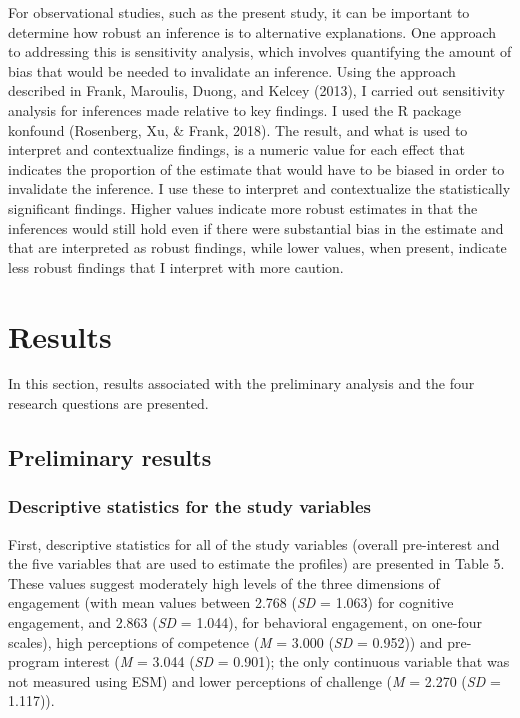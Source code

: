 \documentclass[]{book}
\theoremstyle{definition}
\theoremstyle{definition}
\theoremstyle{definition}
\theoremstyle{remark}
\begin{document}
For observational studies, such as the present study, it can be
important to determine how robust an inference is to alternative
explanations. One approach to addressing this is sensitivity analysis,
which involves quantifying the amount of bias that would be needed to
invalidate an inference. Using the approach described in Frank,
Maroulis, Duong, and Kelcey (2013), I carried out sensitivity analysis
for inferences made relative to key findings. I used the R package
konfound (Rosenberg, Xu, \& Frank, 2018). The result, and what is used
to interpret and contextualize findings, is a numeric value for each
effect that indicates the proportion of the estimate that would have to
be biased in order to invalidate the inference. I use these to interpret
and contextualize the statistically significant findings. Higher values
indicate more robust estimates in that the inferences would still hold
even if there were substantial bias in the estimate and that are
interpreted as robust findings, while lower values, when present,
indicate less robust findings that I interpret with more caution.

\chapter{Results}\label{results}

In this section, results associated with the preliminary analysis and
the four research questions are presented.

\section{Preliminary results}\label{preliminary-results}

\subsection{Descriptive statistics for the study
variables}\label{descriptive-statistics-for-the-study-variables}

First, descriptive statistics for all of the study variables (overall
pre-interest and the five variables that are used to estimate the
profiles) are presented in Table 5. These values suggest moderately high
levels of the three dimensions of engagement (with mean values between
2.768 (\emph{SD} = 1.063) for cognitive engagement, and 2.863 (\emph{SD}
= 1.044), for behavioral engagement, on one-four scales), high
perceptions of competence (\emph{M} = 3.000 (\emph{SD} = 0.952)) and
pre-program interest (\emph{M} = 3.044 (\emph{SD} = 0.901); the only
continuous variable that was not measured using ESM) and lower
perceptions of challenge (\emph{M} = 2.270 (\emph{SD} = 1.117)).
\end{document}
